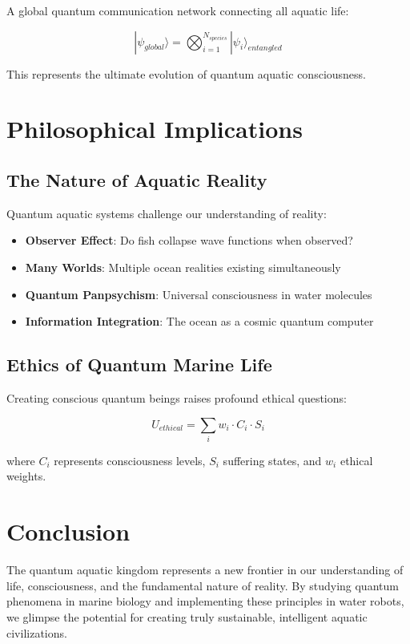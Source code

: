 \documentclass[11pt,a4paper]{article}
\begin{document}
A global quantum communication network connecting all aquatic life:

\begin{equation}
|\psi_{global}\rangle = \bigotimes_{i=1}^{N_{species}} |\psi_i\rangle_{entangled}
\end{equation}

This represents the ultimate evolution of quantum aquatic consciousness.

\section{Philosophical Implications}

\subsection{The Nature of Aquatic Reality}

Quantum aquatic systems challenge our understanding of reality:

\begin{itemize}
    \item \textbf{Observer Effect}: Do fish collapse wave functions when observed?
    \item \textbf{Many Worlds}: Multiple ocean realities existing simultaneously
    \item \textbf{Quantum Panpsychism}: Universal consciousness in water molecules
    \item \textbf{Information Integration}: The ocean as a cosmic quantum computer
\end{itemize}

\subsection{Ethics of Quantum Marine Life}

Creating conscious quantum beings raises profound ethical questions:

\begin{equation}
U_{ethical} = \sum_{i} w_i \cdot C_i \cdot S_i
\end{equation}

where $C_i$ represents consciousness levels, $S_i$ suffering states, and $w_i$ ethical weights.

\section{Conclusion}

The quantum aquatic kingdom represents a new frontier in our understanding of life, consciousness, and the fundamental nature of reality. By studying quantum phenomena in marine biology and implementing these principles in water robots, we glimpse the potential for creating truly sustainable, intelligent aquatic civilizations.
\end{document}
